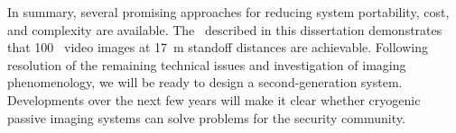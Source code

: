 In summary, several promising approaches for reducing system portability, cost, and complexity are available.
The \Imager\ described in this dissertation demonstrates that \SI{100}{\mK} \NETD\ video images at \SI{17}{\m} standoff distances are achievable.
Following resolution of the remaining technical issues and investigation of imaging phenomenology, we will be ready to design a second-generation system.
Developments over the next few years will make it clear whether cryogenic passive imaging systems can solve problems for the security community.

